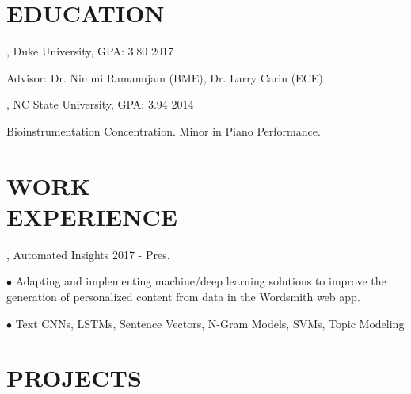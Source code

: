 \documentclass[resmargin, 11pt]{resume_style_class} %
\newenvironment{outline}
  {\begin{list}{}{\setlength{\leftmargin}{30pt}\setlength\itemsep{-2pt}}}
  {\end{list}}
\begin{document}
\begin{resume}


\section{EDUCATION}

, Duke University, GPA: 3.80 \hfill 2017
\begin{outline}
\item Advisor: Dr. Nimmi Ramanujam (BME), Dr. Larry Carin (ECE)
\end{outline}

, NC State University, GPA: 3.94 \hfill 2014
\begin{outline}
\item Bioinstrumentation Concentration. Minor in Piano Performance.
\end{outline}
 
 
 
\section{WORK \\ EXPERIENCE}
, Automated Insights \hfill 2017 - Pres.
\begin{outline}
\item[$\bullet$\hspace{0.1cm}]  Adapting and implementing machine/deep learning solutions to improve the generation of personalized content from data in the Wordsmith web app.
\item[$\bullet$\hspace{0.1cm}]  Text CNNs, LSTMs, Sentence Vectors, N-Gram Models, SVMs, Topic Modeling
\end{outline} 
 
\section{PROJECTS}


\end{resume}
\end{document}
